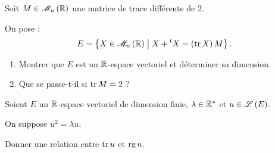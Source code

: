 \begin{corr}
\end{corr}

\begin{exo}
Soit \(M\in\M{n}[\R]\) une matrice de trace différente de \(2\).

On pose : \[E=\accol{X\in\M{n}[\R]\tq X+\trans{X}=\paren{\tr X}M}.\]

\begin{enumerate}
\item Montrer que \(E\) est un \(\mathbb{R}\)-espace vectoriel et déterminer sa dimension. \\

\item Que se passe-t-il si \(\operatorname{tr} M=2\) ?
\end{enumerate}
\end{exo}

\begin{corr}
\end{corr}

\begin{exo}
Soient \(E\) un \(\mathbb{R}\)-espace vectoriel de dimension finie, \(\lambda\in\mathbb{R}^*\) et \(u\in\mathscr{L}\left(E\right)\).

On suppose \(u^2=\lambda u\).

Donner une relation entre \(\operatorname{tr} u\) et \(\operatorname{rg} u\).
\end{exo}

\begin{corr}
\end{corr}